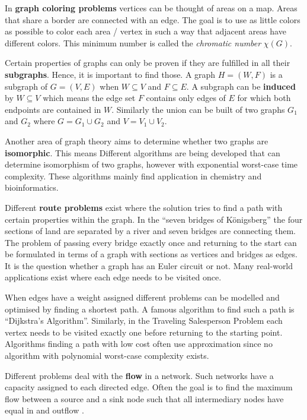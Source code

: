 \documentclass[final]{fhnwreport}       %
\begin{document}
In \textbf{graph coloring problems} vertices can be thought of areas on a map. Areas that share a border are connected with an edge. The goal is to use as little colors as possible to color each area / vertex in such a way that adjacent areas have different colors. This minimum number is called the \textit{chromatic number} $\chi(G)$. 

Certain properties of graphs can only be proven if they are fulfilled in all their \textbf{subgraphs}. Hence, it is important to find those. A graph $H = (W, F)$ is a subgraph of $G = (V, E)$ when $W \subseteq V$ and $F \subseteq E$. A subgraph can be \textbf{induced} by $W \subseteq V$ which means the edge set $F$ contains only edges of $E$ for which both endpoints are contained in $W$. Similarly the union can be built of two graphs $G_1$ and $G_2$ where $G = G_1 \cup G_2$ and $V = V_1 \cup V_2$. 

Another area of graph theory aims to determine whether two graphs are \textbf{isomorphic}. This means  Different algorithms are being developed that can determine isomorphism of two graphs, however with exponential worst-case time complexity. These algorithms mainly find application in chemistry and bioinformatics.  

Different \textbf{route problems} exist where the solution tries to find a path with certain properties within the graph. In the ``seven bridges of Königsberg'' the four sections of land are separated by a river and seven bridges are connecting them. The problem of passing every bridge exactly once and returning to the start can be formulated in terms of a graph with sections as vertices and bridges as edges. It is the question whether a graph has an Euler circuit or not. Many real-world applications exist where each edge needs to be visited once.

When edges have a weight assigned different problems can be modelled and optimised by finding a shortest path. A famous algorithm to find such a path is ``Dijkstra’s Algorithm''. Similarly, in the Traveling Salesperson Problem each vertex needs to be visited exactly one before returning to the starting point. Algorithms finding a path with low cost often use approximation since no algorithm with polynomial worst-case complexity exists. 

Different problems deal with the \textbf{flow} in a network. Such networks have a capacity assigned to each directed edge. Often the goal is to find the maximum flow between a source and a sink node such that all intermediary nodes have equal in and outflow \citep{even_network_1975}.
\end{document}
